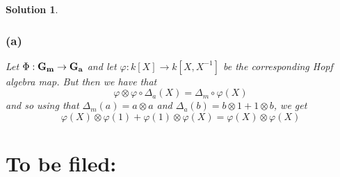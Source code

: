 \documentclass[12pt]{article}
\theoremstyle{nonumberbreak}
\newtheorem{sol}{Solution}
\theoremstyle{changebreak}
\theoremstyle{nonumberplain}
\theoremstyle{change}
\newcommand*{\Ga}{\ensuremath\mathbf{G_a}}
\newcommand*{\Gm}{\ensuremath\mathbf{G_m}}
\begin{document}
\begin{sol}
	\subsubsection*{(a)}
	Let $\Phi:\Gm\to\Ga$ and let $\varphi:k[X]\to k[X,X^{-1}]$ be the corresponding Hopf
	algebra map. But then we have that 
	\[\varphi\otimes\varphi \circ \Delta_a(X)=\Delta_m\circ\varphi(X)\]
	and so using that $\Delta_m(a)=a\otimes a$ and $\Delta_a(b)=b\otimes1+1\otimes b$, we get
	\[\varphi(X)\otimes\varphi(1)+\varphi(1)\otimes\varphi(X)=\varphi(X)\otimes\varphi(X)\]
\end{sol}

\section{To be filed:}


\medskip

\printbibliography
\end{document}
